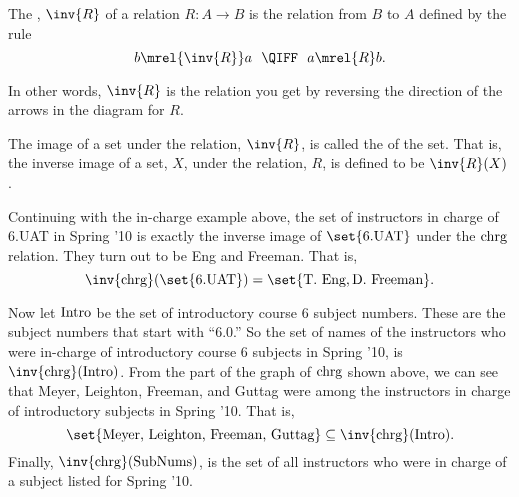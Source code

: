 \begin{definition}
The , $\inv{R}$ of a relation $R: A \to B$ is the
relation from $B$ to $A$ defined by the rule
\[
b \mrel{\inv{R}} a\ \ \QIFF\ \ a \mrel{R} b.
\]
\end{definition}
In other words, $\inv{R}$ is the relation you get by reversing the
direction of the arrows in the diagram for $R$.

\begin{definition}
The image of a set under the relation, $\inv{R}$, is called
the  of the set.  That is, the inverse image of a
set, $X$, under the relation, $R$, is defined to be $\inv{R}(X)$.
\end{definition}

Continuing with the in-charge example above, the set of instructors in charge of
6.UAT in Spring '10 is exactly the inverse image of $\set{\text{6.UAT}}$
under the $\text{chrg}$ relation.  They turn out to be Eng and Freeman.  That
is,
\[
\inv{\inchrg}(\set{\text{6.UAT}}) = \set{\text{T. Eng}, \text{D. Freeman}}.
\]

Now let $\text{Intro}$ be the set of introductory course 6 subject
numbers.  These are the subject numbers that start with ``6.0.''  So
the set of names of the instructors who were in-charge of introductory course 6
subjects in Spring '10, is $\inv{\inchrg}(\introsub)$.  From the part of
the graph of $\text{chrg}$ shown above, we can see that Meyer, Leighton,
Freeman, and Guttag were among the instructors in charge of introductory
subjects in Spring '10.  That is,
\[
\set{\text{Meyer, Leighton, Freeman, Guttag}} \subseteq \inv{\inchrg}(\introsub).
\]
Finally, $\inv{\inchrg}(\subnums)$, is the set of all instructors who
were in charge of a subject listed for Spring '10.

\iffalse
It gets interesting when we write composite expressions mixing images,
inverse images and set operations.  For example, $T(\inv{T}(D))$ is
the set of Spring '09 subjects that have an instructor in charge who
also is in in charge of an introductory subject.  So $T(\inv{T}(D)) -
D$ are the advanced subjects with someone in-charge who is also
in-charge of an introductory subject.  Similarly, $\inv{T}(D) \intersect
\inv{T}(N-D)$ is the set of faculty in charge of both an introductory \emph{and}
an advanced subject in Spring '09.
\fi

\begin{problems}
\practiceproblems
{}

\classproblems
{}

\homeworkproblems
\end{problems}

